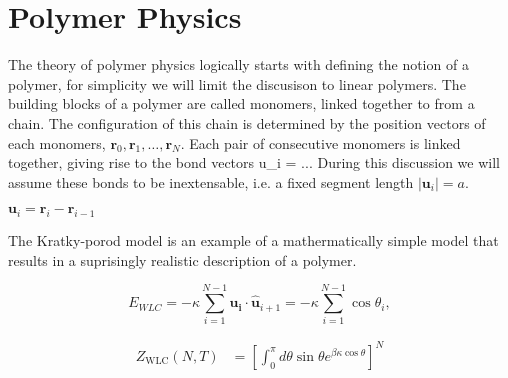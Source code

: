 \section{Polymer Physics}
The theory of polymer physics logically starts with defining the notion of a polymer, for
simplicity we will limit the discusison to linear polymers. The building blocks of a
polymer are called monomers, linked together to from a chain. The configuration of this
chain is determined by the position vectors of each monomers, ${\boldsymbol{r}_0,
\boldsymbol{r}_1, \dots, \boldsymbol{r}_N}$. Each pair of consecutive monomers is linked
together, giving rise to the bond vectors u_i = ... During this discussion we will assume
these bonds to be inextensable, i.e. a fixed segment length $|\boldsymbol{u}_i| = a$.

$\boldsymbol{u}_i = \boldsymbol{r}_i - \boldsymbol{r}_{i-1}$

The Kratky-porod model is an example of a mathermatically simple
model that results in a suprisingly realistic description of a polymer.

\begin{equation}
    E_{WLC}= -\kappa \sum_{i=1}^{N-1} \boldsymbol{\hat{u}_i} \cdot \boldsymbol{\hat{u}}_{i+1}
    = -\kappa
    \sum_{i=1}^{N-1} \cos\theta_i,
\end{equation}

\begin{equation}
\begin{aligned}
    \label{210}
    Z_{\mathrm{WLC}}(N, T)
    &= \left[\int_{0}^{\pi} d \theta \sin \theta e^{\beta \kappa \cos \theta}\right]^{N}
\end{aligned}
\end{equation}

